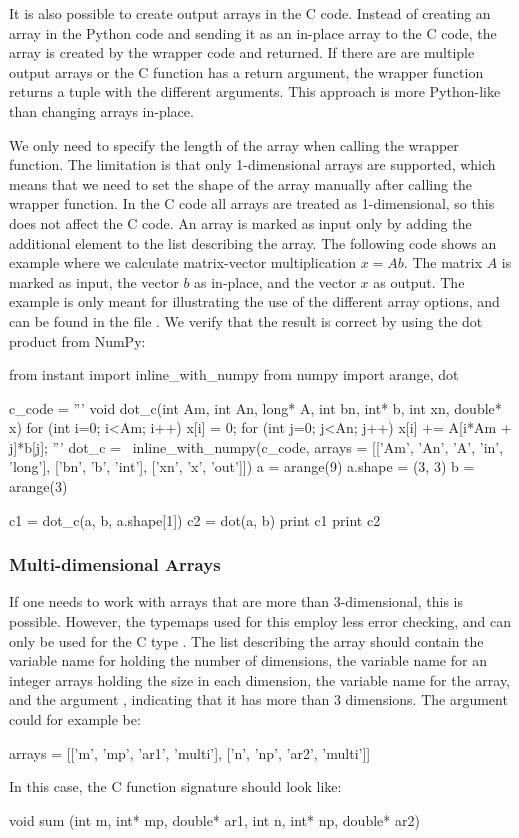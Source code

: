 It is also possible to create output arrays in the C code. Instead of creating
an array in the Python code and sending it as an in-place array to the C
code, the array is created by the wrapper code and returned. If there are are
multiple output arrays or the C function has a return argument, the wrapper
function returns a tuple with the different arguments. This approach is more
Python-like than changing arrays in-place. 

We only need to specify the length of the array when calling the wrapper
function. The limitation is that only 1-dimensional arrays are supported,
which means that we need to set the shape of the array manually after calling
the wrapper function. In the C code all arrays are treated as 1-dimensional,
so this does not affect the C code. An array is marked as input only by adding
the additional element  to the list describing the array. The
following code shows an example where we calculate matrix-vector
multiplication $x = Ab$. The matrix $A$ is marked as input, the vector $b$ as
in-place, and the vector $x$ as output. The example is only meant for
illustrating the use of the different array options, and can be found in the
file . We verify that the result is correct by using
the dot product from NumPy:
\begin{code}
from instant import inline_with_numpy
from numpy import arange, dot

c_code = '''
void dot_c(int Am, int An, long* A, int bn, int* b,
           int xn, double* x)
{
  for (int i=0; i<Am; i++)
  {
    x[i] = 0;
    for (int j=0; j<An; j++)
    {
      x[i] += A[i*Am + j]*b[j];
    }
  }
}
'''
dot_c = \
  inline_with_numpy(c_code,
                    arrays = [['Am', 'An', 'A', 'in', 'long'],
                              ['bn', 'b', 'int'],
                              ['xn', 'x', 'out']])
a = arange(9)
a.shape = (3, 3)
b = arange(3)

c1 = dot_c(a, b, a.shape[1])
c2 = dot(a, b)
print c1
print c2
\end{code}


\subsubsection{Multi-dimensional Arrays}
If one needs to work with arrays that are more than 3-dimensional, this is
possible. However, the typemaps used for this employ less error checking, and
can only be used for the C type \emp{double}. The list describing the array
should contain the variable name for holding the number of dimensions, the
variable name for an integer arrays holding the size in each dimension, the
variable name for the array, and the argument \emp{'multi'}, indicating that
it has more than 3 dimensions. The \emp{arrays} argument could for example be:
\begin{code}
arrays = [['m', 'mp', 'ar1', 'multi'],
          ['n', 'np', 'ar2', 'multi']]
\end{code}
In this case, the C function signature should look like:
\begin{code}
void sum (int m, int* mp, double* ar1, int n,
          int* np, double* ar2)
\end{code}

